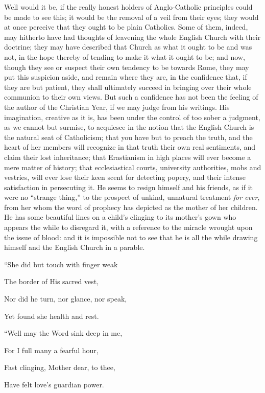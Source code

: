 Well would it be, if the really honest holders of
Anglo-Catholic principles could be made to see this; it would be
the removal of a veil from their eyes; they would at once perceive
that they ought to be plain Catholics. Some of them, indeed, may
hitherto have had thoughts of leavening the whole English Church with
their doctrine; they may have described that Church as what it ought
to be and was not, in the hope thereby of tending to make it what it
ought to be; and now, though they see or suspect their own tendency to
be towards Rome, they may put this suspicion aside, and remain where
they are, in the confidence that, if they are but patient, they shall
ultimately succeed in bringing over their whole communion to their own
views. But such a confidence has not been the feeling of the author of
the Christian Year, if we may judge from his writings. His
imagination, creative as it is, has been under the control of too
sober a judgment, as we cannot but surmise, to acquiesce in the notion
that the English Church is the natural seat of Catholicism; that you
have but to preach the truth, and the heart of her members will
recognize in that truth their own real sentiments, and claim their
lost inheritance; that Erastianism in high places will ever become a
mere matter of history; that ecclesiastical courts, university
authorities, mobs and vestries, will ever lose their keen scent for
detecting popery, and their intense satisfaction in persecuting it. He
seems to resign himself and his friends, as if it were no ``strange
thing,'' to the prospect of unkind, unnatural treatment \emph{for ever},
from her whom the word of prophecy has depicted as the mother of her
children. He has some beautiful lines on a child's clinging to its
mother's gown who appears the while to disregard it, with a reference
to the miracle wrought upon the issue of blood: and it is impossible
not to see that he is all the while drawing himself and the
English Church in a parable.

``She did
but touch with finger weak

The border of His sacred vest,

Nor did he turn, nor glance, nor speak,

Yet found she health and rest.

``Well
may the Word sink deep in me,

For I full many a fearful hour,

Fast clinging, Mother dear, to thee,

Have felt love's guardian power.

